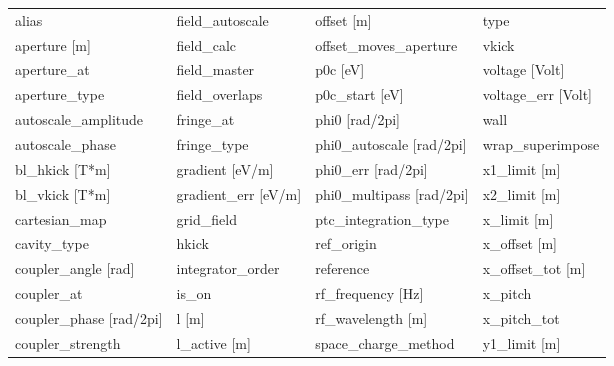  \begin{tabular}{llll} \toprule
alias                            & field_autoscale                  & offset [m]                       & type                             \\
aperture [m]                     & field_calc                       & offset_moves_aperture            & vkick                            \\
aperture_at                      & field_master                     & p0c [eV]                         & voltage [Volt]                   \\
aperture_type                    & field_overlaps                   & p0c_start [eV]                   & voltage_err [Volt]               \\
autoscale_amplitude              & fringe_at                        & phi0 [rad/2pi]                   & wall                             \\
autoscale_phase                  & fringe_type                      & phi0_autoscale [rad/2pi]         & wrap_superimpose                 \\
bl_hkick [T*m]                   & gradient [eV/m]                  & phi0_err [rad/2pi]               & x1_limit [m]                     \\
bl_vkick [T*m]                   & gradient_err [eV/m]              & phi0_multipass [rad/2pi]         & x2_limit [m]                     \\
cartesian_map                    & grid_field                       & ptc_integration_type             & x_limit [m]                      \\
cavity_type                      & hkick                            & ref_origin                       & x_offset [m]                     \\
coupler_angle [rad]              & integrator_order                 & reference                        & x_offset_tot [m]                 \\
coupler_at                       & is_on                            & rf_frequency [Hz]                & x_pitch                          \\
coupler_phase [rad/2pi]          & l [m]                            & rf_wavelength [m]                & x_pitch_tot                      \\
coupler_strength                 & l_active [m]                     & space_charge_method              & y1_limit [m]                     \\

\end{tabular}
